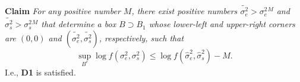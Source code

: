 \documentclass{report}
\newcommand{\RL}{f}
\newcommand{\logRL}{\log\RL}
\newcommand{\sigssq}{\sigma_s^2}
\newcommand{\sigesq}{\sigma_e^2}
\newcommand{\sshat}{\hat\sigma^2_e,\hat\sigma^2_s}
\newcommand{\logRLss}{\logRL(\sigesq,\sigssq)}
\begin{document}
\noindent\textbf{Claim} \emph{For any positive number $M$, there exist positive numbers $\widetilde{\sigma_e^2} > \sigesq{}^M$ and $\widetilde{\sigma_s^2} > \sigssq{}^M$ that determine a box $B \supset B_1$ whose lower-left and upper-right corners are $(0,0)$ and $(\widetilde{\sigma_e^2}, \widetilde{\sigma_s^2})$, respectively, such that
\begin{equation*}
  \sup_{B^c} \logRLss \le \logRL(\sshat) - M.
\end{equation*}}
I.e., \textbf{D1} is satisfied.\\[5pt]
\end{document}
